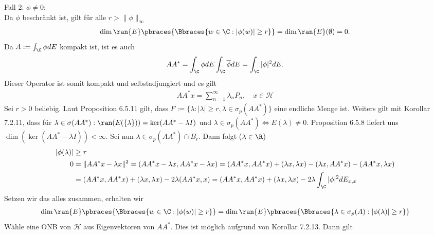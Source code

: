 \begin{solution}
Fall 2: $\phi \neq 0:$ \\
Da $\phi$ beschränkt ist, gilt für alle $r > \|\phi\|_{\infty}$
\begin{align*}
  \dim{\ran{E}}\pbraces{\Bbraces{w \in \C:|\phi(w)| \geq r}}
  = \dim{\ran{E}}(\emptyset) = 0.
\end{align*}
Da $A := \int_{\C} \phi dE$ kompakt ist, ist es auch
\begin{align*}
  AA^* = \int_{\C} \phi dE\int_{\C} \overline{\phi} dE = \int_{\C} |\phi|^2 dE.
\end{align*}
Dieser Operator ist somit kompakt und selbstadjungiert und es gilt
\begin{align*}
  AA^*x = \sum_{n=1}^{\infty}\lambda_nP_n, \quad x \in \mathcal{H}
\end{align*}
Sei $r > 0$ beliebig. Laut Proposition 6.5.11 gilt, dass
$F := \{\lambda: |\lambda| \geq r, \lambda \in \sigma_p(AA^*)\}$ eine endliche Menge
ist.
Weiters gilt mit Korollar 7.2.11, dass für
$\lambda \in \sigma(AA^*) : \ran(E(\{\lambda\})) = \ker(AA^* - \lambda I)$
und $\lambda \in \sigma_p(AA^*) \iff E(\lambda) \neq 0$.
Proposition 6.5.8 liefert uns $\dim(\ker(AA^* -\lambda I)) < \infty$.
Sei nun $\lambda \in \sigma_p(AA^*) \cap B_r$. Dann folgt ($\lambda \in \R$)
\begin{align*}
  |\phi(\lambda)| &\geq r \\
  0 &= \|AA^*x - \lambda x\|^2 = (AA^*x - \lambda x,AA^*x - \lambda x)
  = (AA^*x,AA^*x) + (\lambda x, \lambda x) -(\lambda x,AA^*x) - (AA^*x,\lambda x) \\
  &= (AA^*x,AA^*x) + (\lambda x, \lambda x) -2\lambda(AA^*x,x)
  = (AA^*x,AA^*x) + (\lambda x, \lambda x) -2\lambda\int_{\C}|\phi|^2dE_{x,x}
\end{align*}
Setzen wir das alles zusammen, erhalten wir
\begin{align*}
  \dim{\ran{E}}\pbraces{\Bbraces{w \in \C:|\phi(w)| \geq r}} =
  \dim{\ran{E}}\pbraces{\Bbraces{\lambda \in \sigma_p(A):|\phi(\lambda)| \geq r}}
\end{align*}
Wähle eine ONB von $\mathcal{H}$ aus Eigenvektoren von $AA^*$.
Dies ist möglich aufgrund von Korollar 7.2.13. Dann gilt
\end{solution}
